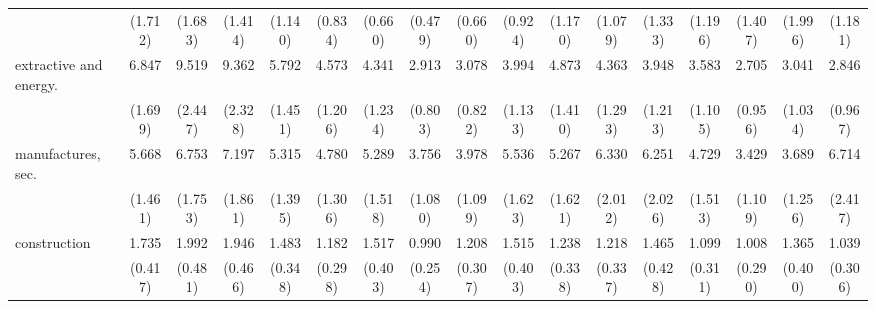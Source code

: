 {\begin{tabular}{l*{16}{c}}
                    &     (1.712)         &     (1.683)         &     (1.414)         &     (1.140)         &     (0.834)         &     (0.660)         &     (0.479)         &     (0.660)         &     (0.924)         &     (1.170)         &     (1.079)         &     (1.333)         &     (1.196)         &     (1.407)         &     (1.996)         &     (1.181)         \\
[1em]
extractive and energy.&       6.847\sym{***}&       9.519\sym{***}&       9.362\sym{***}&       5.792\sym{***}&       4.573\sym{***}&       4.341\sym{***}&       2.913\sym{***}&       3.078\sym{***}&       3.994\sym{***}&       4.873\sym{***}&       4.363\sym{***}&       3.948\sym{***}&       3.583\sym{***}&       2.705\sym{**} &       3.041\sym{**} &       2.846\sym{**} \\
                    &     (1.699)         &     (2.447)         &     (2.328)         &     (1.451)         &     (1.206)         &     (1.234)         &     (0.803)         &     (0.822)         &     (1.133)         &     (1.410)         &     (1.293)         &     (1.213)         &     (1.105)         &     (0.956)         &     (1.034)         &     (0.967)         \\
[1em]
manufactures, sec.  &       5.668\sym{***}&       6.753\sym{***}&       7.197\sym{***}&       5.315\sym{***}&       4.780\sym{***}&       5.289\sym{***}&       3.756\sym{***}&       3.978\sym{***}&       5.536\sym{***}&       5.267\sym{***}&       6.330\sym{***}&       6.251\sym{***}&       4.729\sym{***}&       3.429\sym{***}&       3.689\sym{***}&       6.714\sym{***}\\
                    &     (1.461)         &     (1.753)         &     (1.861)         &     (1.395)         &     (1.306)         &     (1.518)         &     (1.080)         &     (1.099)         &     (1.623)         &     (1.621)         &     (2.012)         &     (2.026)         &     (1.513)         &     (1.109)         &     (1.256)         &     (2.417)         \\
[1em]
construction        &       1.735\sym{*}  &       1.992\sym{**} &       1.946\sym{**} &       1.483         &       1.182         &       1.517         &       0.990         &       1.208         &       1.515         &       1.238         &       1.218         &       1.465         &       1.099         &       1.008         &       1.365         &       1.039         \\
                    &     (0.417)         &     (0.481)         &     (0.466)         &     (0.348)         &     (0.298)         &     (0.403)         &     (0.254)         &     (0.307)         &     (0.403)         &     (0.338)         &     (0.337)         &     (0.428)         &     (0.311)         &     (0.290)         &     (0.400)         &     (0.306)         \\

\end{tabular}}
